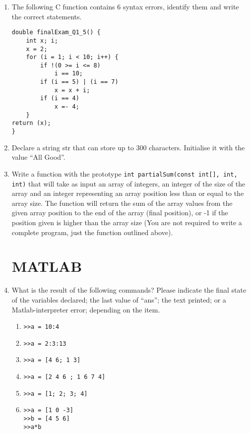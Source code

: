 \documentclass{lab}
\begin{document}
\begin{enumerate}
\begin{lstlisting}[style=CStyle]
	while (counter > arr[2]) {
		counter -= 1;
		number += arr[counter];
	}
	printf(“number = %d \n”, number);
	return (0);
}
\end{lstlisting}

\item The following C function contains 6 syntax errors, identify them and write the
correct statements.

\begin{lstlisting}[style=CStyle]
double finalExam_Q1_5() {
	int x; i;
	x = 2;
	for (i = 1; i < 10; i++) {
		if !(0 >= i <= 8)
			i == 10;
		if (i == 5) | (i == 7)
			x = x + i;
		if (i == 4)
			x =- 4;
	}
return (x);
}
\end{lstlisting}

\item Declare a string str that can store up to 300 characters. Initialise it with the value ``All Good''.

\item Write a function with the prototype \texttt{int partialSum(const int[], int, int)} that will take as input an array of integers, an integer of the size of the array and an integer representing an array position less than or equal to the array size. The function will return the sum of the array values from the given array position to the end of the array (final position), or -1 if the position given is higher than the array size (You are not required to write a complete program, just the function outlined above).

\pagebreak
\section{MATLAB}

\item What is the result of the following commands? Please indicate the final state of the variables declared; the last value of “ans”; the text printed; or a Matlab-interpreter error; depending on the item.

	\begin{enumerate}
\item \texttt{>>a = 10:4}
\item \texttt{>>a = 2:3:13}
\item \texttt{>>a = [4 6; 1 3]}
\item \texttt{>>a = [2 4 6 ; 1 6 7 4]}
\item \texttt{>>a = [1; 2; 3; 4]}

\item \texttt{>>a = [1 0 -3]}\\
\texttt{>>b = [4 5 6]}\\
\texttt{>>a*b}


\end{enumerate}
\end{enumerate}
\end{document}
